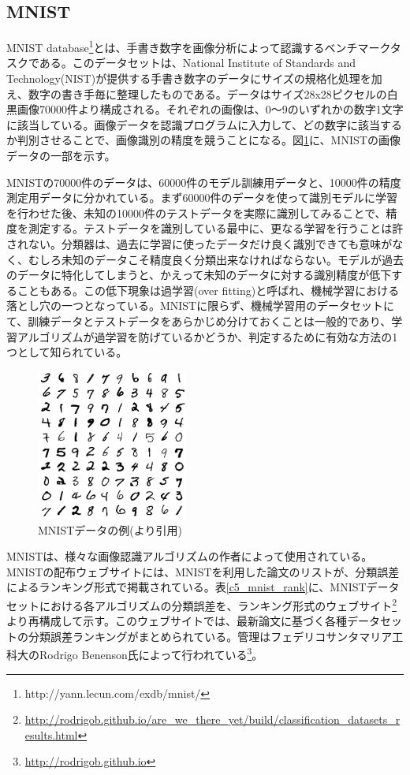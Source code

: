 \subsection{MNIST}
MNIST database\footnote{http://yann.lecun.com/exdb/mnist/}とは、手書き数字を画像分析によって認識するベンチマークタスクである。このデータセットは、National Institute of Standards and Technology(NIST)が提供する手書き数字のデータにサイズの規格化処理を加え、数字の書き手毎に整理したものである。データはサイズ28x28ピクセルの白黒画像70000件より構成される\cite{lecun1998gradient-based}。それぞれの画像は、0〜9のいずれかの数字1文字に該当している。画像データを認識プログラムに入力して、どの数字に該当するか判別させることで、画像識別の精度を競うことになる。図\ref{c5_mnist_ex}に、MNISTの画像データの一部を示す。\par
MNISTの70000件のデータは、60000件のモデル訓練用データと、10000件の精度測定用データに分かれている。まず60000件のデータを使って識別モデルに学習を行わせた後、未知の10000件のテストデータを実際に識別してみることで、精度を測定する。テストデータを識別している最中に、更なる学習を行うことは許されない。分類器は、過去に学習に使ったデータだけ良く識別できても意味がなく、むしろ未知のデータこそ精度良く分類出来なければならない。モデルが過去のデータに特化してしまうと、かえって未知のデータに対する識別精度が低下することもある。この低下現象は過学習(over fitting)と呼ばれ、機械学習における落とし穴の一つとなっている。MNISTに限らず、機械学習用のデータセットにて、訓練データとテストデータをあらかじめ分けておくことは一般的であり、学習アルゴリズムが過学習を防げているかどうか、判定するために有効な方法の1つとして知られている。\par
\begin{figure}[tbp]
 \begin{center}
  \includegraphics[width=50mm]{img/c5/mnist_ex}
 \end{center}
 \caption{MNISTデータの例(\cite{lecun1998gradient-based}より引用)}
 \label{c5_mnist_ex}
\end{figure}
MNISTは、様々な画像認識アルゴリズムの作者によって使用されている。MNISTの配布ウェブサイトには、MNISTを利用した論文のリストが、分類誤差によるランキング形式で掲載されている。表\ref{c5_mnist_rank}に、MNISTデータセットにおける各アルゴリズムの分類誤差を、ランキング形式のウェブサイト\footnote{\label{c5_rank}\url{http://rodrigob.github.io/are_we_there_yet/build/classification_datasets_results.html}}より再構成して示す。このウェブサイトでは、最新論文に基づく各種データセットの分類誤差ランキングがまとめられている。管理はフェデリコサンタマリア工科大のRodrigo Benenson氏によって行われている\footnote{\url{http://rodrigob.github.io}}。

